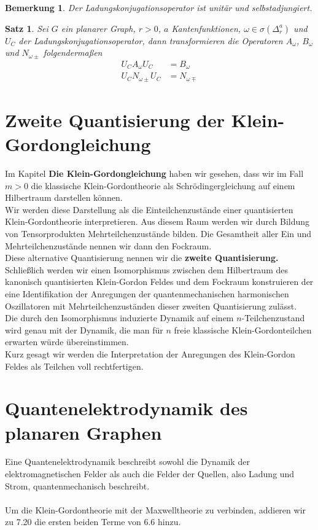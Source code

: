 \documentclass[11pt,a4paper,leqno]{report}
\newtheorem{proposition}{Satz}[chapter]
\newtheorem{remark}[theorem]{Bemerkung}
\numberwithin{equation}{chapter}
\begin{document}
\begin{remark}
	Der Ladungskonjugationsoperator ist unit\"ar und selbstadjungiert.
\end{remark}
\begin{proposition}
	Sei $G$ ein planarer Graph, $r>0$, $a$ Kantenfunktionen, $\omega\in\sigma(\Delta_r^a)$ und $U_C$ der Ladungskonjugationsoperator, dann transformieren die Operatoren $A_\omega$, $B_\omega$ und $N_{\omega\pm}$ folgenderma\ss{}en
	\begin{align}
	U_CA_\omega U_C &= B_\omega\\
	U_C N_{\omega \pm} U_C &= N_{\omega \mp}
\end{align}
\end{proposition}
\chapter{Zweite Quantisierung der Klein-Gordongleichung}
Im Kapitel \textbf{Die Klein-Gordongleichung} haben wir gesehen, dass wir im Fall $m>0$ die klassische Klein-Gordontheorie als Schr\"odingergleichung auf einem Hilbertraum darstellen k\"onnen.\\
Wir werden diese Darstellung als die Einteilchenzust\"ande einer quantisierten Klein-Gordontheorie interpretieren.
Aus diesem Raum werden wir durch Bildung von Tensorprodukten Mehrteilchenzust\"ande bilden. Die Gesamtheit aller Ein und Mehrteilchenzust\"ande nennen wir dann den Fockraum.\\
Diese alternative Quantisierung nennen wir die \textbf{zweite Quantisierung.}\\
 Schlie\ss{}lich werden wir einen Isomorphismus zwischen dem Hilbertraum des kanonisch quantisierten Klein-Gordon Feldes und dem Fockraum konstruieren der eine Identifikation der Anregungen der quantenmechanischen harmonischen Oszillatoren mit Mehrteilchenzust\"anden dieser zweiten Quantisierung zul\"asst.\\
 Die durch den Isomorphismus induzierte Dynamik auf einem $n$-Teilchenzustand wird genau mit der Dynamik, die man f\"ur $n$ freie klassische Klein-Gordonteilchen erwarten w\"urde \"ubereinstimmen.\\
 Kurz gesagt wir werden die Interpretation der Anregungen des Klein-Gordon Feldes als Teilchen voll rechtfertigen.
\chapter{Quantenelektrodynamik des planaren Graphen}
Eine Quantenelektrodynamik beschreibt sowohl die Dynamik der elektromagnetischen Felder als auch die Felder der Quellen, also Ladung und Strom, quantenmechanisch beschreibt.\\
\\ 
Um die Klein-Gordontheorie mit der Maxwelltheorie zu verbinden, addieren wir zu 7.20 die ersten beiden Terme von 6.6 hinzu.
\end{document}
